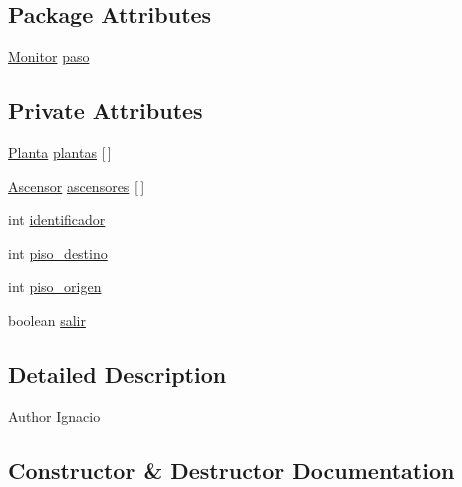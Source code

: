 \subsection*{Package Attributes}
\begin{DoxyCompactItemize}
\item 
\mbox{\hyperlink{classpecl6part1_1_1_monitor}{Monitor}} \mbox{\hyperlink{classpecl6part1_1_1_persona_a5bad8cf9009a1412b98f0585761ba19a}{paso}}
\end{DoxyCompactItemize}
\subsection*{Private Attributes}
\begin{DoxyCompactItemize}
\item 
\mbox{\hyperlink{classpecl6part1_1_1_planta}{Planta}} \mbox{\hyperlink{classpecl6part1_1_1_persona_aa5841c74449c09b7aa8e0c646365228d}{plantas}} \mbox{[}$\,$\mbox{]}
\item 
\mbox{\hyperlink{classpecl6part1_1_1_ascensor}{Ascensor}} \mbox{\hyperlink{classpecl6part1_1_1_persona_a4a61953407b3ad73a3dfcc9314f36d73}{ascensores}} \mbox{[}$\,$\mbox{]}
\item 
int \mbox{\hyperlink{classpecl6part1_1_1_persona_a21697d6304f8709b939317b63daccdcc}{identificador}}
\item 
int \mbox{\hyperlink{classpecl6part1_1_1_persona_a2601b87adc4d07c03478b8a5dec4289e}{piso\+\_\+destino}}
\item 
int \mbox{\hyperlink{classpecl6part1_1_1_persona_a6a8187e7b1c423eb263a336a573d634f}{piso\+\_\+origen}}
\item 
boolean \mbox{\hyperlink{classpecl6part1_1_1_persona_aaf35f4def1c5244a3e8d464a88e66243}{salir}}
\end{DoxyCompactItemize}


\subsection{Detailed Description}
\begin{DoxyAuthor}{Author}
Ignacio 
\end{DoxyAuthor}


\subsection{Constructor \& Destructor Documentation}
\mbox{\label{classpecl6part1_1_1_persona_a81592bc70d6788bd895eda5b5d42a250}} 
